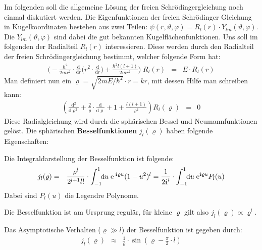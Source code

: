 Im folgenden soll die allgemeine Lösung der freien Schrödingergleichung noch einmal diskutiert werden. Die Eigenfunktionen der freien Schrödinger Gleichung in Kugelkoordinaten bestehen aus zwei Teilen: $\psi(r,\vartheta,\varphi) = R_l(r)\cdot Y_{lm}(\vartheta,\varphi)$. Die $Y_{lm}(\vartheta,\varphi)$ sind dabei die gut bekannten Kugelflächenfunktionen. Uns soll im folgenden der Radialteil $R_l(r)$ interessieren. Diese werden durch den Radialteil der freien Schrödingergleichung bestimmt, welcher folgende Form hat:
\begin{eqnarray*}
	\bigg( -\frac{\hbar^2}{2mr^2}\cdot \frac{\mathrm{d}}{\mathrm{d}r} \Big( r^2\cdot\frac{\mathrm{d}}{\mathrm{d}r} \Big) + \frac{\hbar^2 l(l+1)}{2mr^2} \bigg)\; R_l(r) &=& E\cdot R_l(r)
\end{eqnarray*}
Man definiert nun ein $\varrho=\sqrt{2mE/\hbar^2}\cdot r=kr$, mit dessen Hilfe man schreiben kann: 
\begin{eqnarray*}
\left( \frac{\mathrm{d}^2}{\mathrm{d}\varrho^2} + \frac{2}{\varrho}\cdot\frac{\mathrm{d}}{\mathrm{d}\varrho} + 1 + \frac{l(l+1)}{\varrho^2} \right) R_l(\varrho) &=& 0
\end{eqnarray*}
Diese Radialgleichung wird durch die sphärischen Bessel und Neumannfunktionen gelöst. Die sphärischen {\bf Besselfunktionen} $j_l(\varrho)$ haben folgende Eigenschaften: 
\begin{itemize1}
	\item Die Integraldarstellung der Besselfunktion ist folgende: 
	\begin{eqnarray*} 
		j_l(\varrho) &=& \frac{\varrho^l}{2^{l+1}l!}\cdot\int_{-1}^1 \!\!\mathrm{d}u\; \e^{\;\I\varrho u}(1-u^2)^l = \frac{1}{2\I^l} \cdot\int_{-1}^1\!\! \mathrm{d}u\; \e^{\I\varrho u} P_l(u)
	\end{eqnarray*}
	Dabei sind $P_l(u)$ die Legendre Polynome. 
	\item Die Besselfunktion ist am Ursprung regulär, für kleine $\varrho$ gilt also $j_l(\varrho)\propto \varrho^l$. 
	\item Das Asymptotische Verhalten ($\varrho\gg l$) der Besselfunktion ist gegeben durch: 
	\begin{eqnarray*}
		j_l(\varrho) &\approx& \frac{1}{\varrho} \cdot \sin\left(\varrho-\frac{\pi}{2} \cdot l \right)
	\end{eqnarray*}
\end{itemize1}

